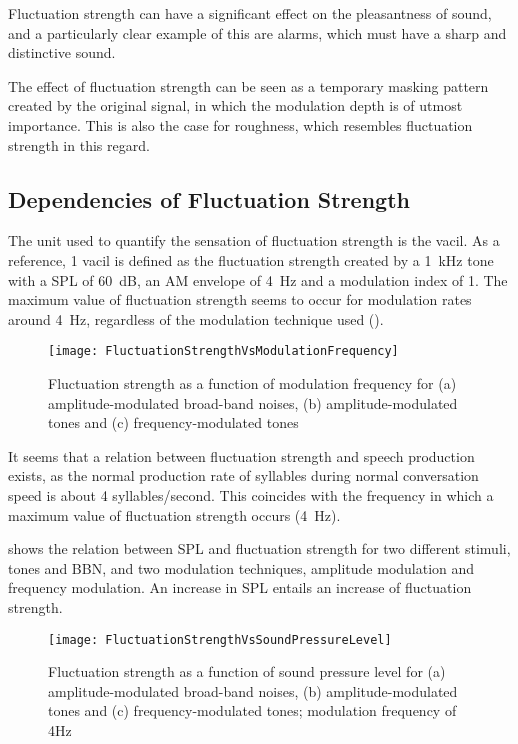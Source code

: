 \documentclass[../main.tex]{subfiles}
\begin{document}
\begin{theoreticalbackground}
Fluctuation strength can have a significant effect on the pleasantness of sound,
and a particularly clear example of this are alarms, which must have a sharp and
distinctive sound.

The effect of fluctuation strength can be seen as a temporary masking pattern
created by the original signal, in which the modulation depth is of utmost
importance. This is also the case for roughness, which resembles fluctuation
strength in this regard.

\subsection{Dependencies of Fluctuation Strength}

The unit used to quantify the sensation of fluctuation strength is the vacil. As
a reference, 1 vacil is defined as the fluctuation strength created by a 1~kHz
tone with a \gls{SPL} of 60~dB, an \gls{AM} envelope of 4~Hz and a modulation
index of 1. The maximum value of fluctuation strength seems to occur for
modulation rates around 4~Hz, regardless of the modulation technique used
().

\begin{figure}[!ht]
  \centering
  \texttt{[image: FluctuationStrengthVsModulationFrequency]}
  \caption{Fluctuation strength as a function of modulation frequency for (a)
    amplitude-modulated broad-band noises, (b) amplitude-modulated tones and (c)
    frequency-modulated tones~\cite[pp.~248]{Fastl2007Psychoacoustics}}
\label{fig:flucstrenvmodfreq}
\end{figure}

It seems that a relation between fluctuation strength and speech production
exists, as the normal production rate of syllables during normal conversation
speed is about 4 syllables/second. This coincides with the frequency in which a
maximum value of fluctuation strength occurs (4~Hz).

 shows the relation between \gls{SPL} and
fluctuation strength for two different stimuli, tones and \gls{BBN}, and two
modulation techniques, amplitude modulation and frequency modulation. An
increase in \gls{SPL} entails an increase of fluctuation strength.

\begin{figure}[!ht]
  \centering
  \texttt{[image: FluctuationStrengthVsSoundPressureLevel]}
  \caption{Fluctuation strength as a function of sound pressure level for (a)
    amplitude-modulated broad-band noises, (b) amplitude-modulated tones and (c)
    frequency-modulated tones; modulation frequency of
    4Hz~\cite[pp.~249]{Fastl2007Psychoacoustics}}
\label{fig:flucstrenvsndpreslvl}
\end{figure}


\end{theoreticalbackground}
\end{document}
